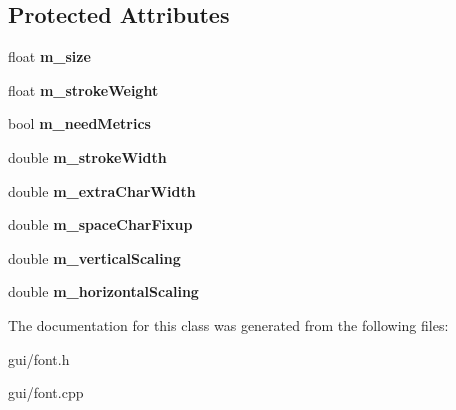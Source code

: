 \subsection*{Protected Attributes}
\begin{DoxyCompactItemize}
\item 
float {\bfseries m\+\_\+size}\hypertarget{classFont_ae486ccbfea0edbb501f6a6bced528e5f}{}\label{classFont_ae486ccbfea0edbb501f6a6bced528e5f}

\item 
float {\bfseries m\+\_\+stroke\+Weight}\hypertarget{classFont_a3fa8629d3db1db583920bee2c070b324}{}\label{classFont_a3fa8629d3db1db583920bee2c070b324}

\item 
bool {\bfseries m\+\_\+need\+Metrics}\hypertarget{classFont_a8a5cee982178a3fbaea1df6cd11fbb1d}{}\label{classFont_a8a5cee982178a3fbaea1df6cd11fbb1d}

\item 
double {\bfseries m\+\_\+stroke\+Width}\hypertarget{classFont_a2cf1d258de7089376b109ae766f944dd}{}\label{classFont_a2cf1d258de7089376b109ae766f944dd}

\item 
double {\bfseries m\+\_\+extra\+Char\+Width}\hypertarget{classFont_a466abcbe811cd531491b68c349a2ba94}{}\label{classFont_a466abcbe811cd531491b68c349a2ba94}

\item 
double {\bfseries m\+\_\+space\+Char\+Fixup}\hypertarget{classFont_a1aa27d37be126f5db9a8e5c7e3411a90}{}\label{classFont_a1aa27d37be126f5db9a8e5c7e3411a90}

\item 
double {\bfseries m\+\_\+vertical\+Scaling}\hypertarget{classFont_a8321146126cfa5a1f81c3c424bfb7874}{}\label{classFont_a8321146126cfa5a1f81c3c424bfb7874}

\item 
double {\bfseries m\+\_\+horizontal\+Scaling}\hypertarget{classFont_a422ec7bc502b57586b0a91e2b4a9e9c5}{}\label{classFont_a422ec7bc502b57586b0a91e2b4a9e9c5}

\end{DoxyCompactItemize}


The documentation for this class was generated from the following files\+:\begin{DoxyCompactItemize}
\item 
gui/font.\+h\item 
gui/font.\+cpp\end{DoxyCompactItemize}
